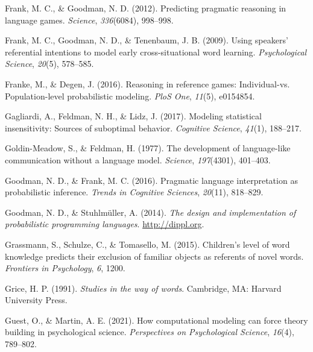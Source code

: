 \documentclass[
  man,floatsintext]{apa6}
\newlength{\cslhangindent}
\newlength{\cslentryspacingunit} %
\newenvironment{CSLReferences}[2] %
 {%
  \setlength{\parindent}{0pt}
  \ifodd #1
  \let\oldpar\par
  \def\par{\hangindent=\cslhangindent\oldpar}
  \fi
  \setlength{\parskip}{#2\cslentryspacingunit}
 }%
 {}
\begin{document}
\begin{CSLReferences}{1}{0}
\leavevmode{}%
Frank, M. C., \& Goodman, N. D. (2012). Predicting pragmatic reasoning in language games. \emph{Science}, \emph{336}(6084), 998--998.

\leavevmode{}%
Frank, M. C., Goodman, N. D., \& Tenenbaum, J. B. (2009). Using speakers' referential intentions to model early cross-situational word learning. \emph{Psychological Science}, \emph{20}(5), 578--585.

\leavevmode{}%
Franke, M., \& Degen, J. (2016). Reasoning in reference games: Individual-vs. Population-level probabilistic modeling. \emph{PloS One}, \emph{11}(5), e0154854.

\leavevmode{}%
Gagliardi, A., Feldman, N. H., \& Lidz, J. (2017). Modeling statistical insensitivity: Sources of suboptimal behavior. \emph{Cognitive Science}, \emph{41}(1), 188--217.

\leavevmode{}%
Goldin-Meadow, S., \& Feldman, H. (1977). The development of language-like communication without a language model. \emph{Science}, \emph{197}(4301), 401--403.

\leavevmode{}%
Goodman, N. D., \& Frank, M. C. (2016). Pragmatic language interpretation as probabilistic inference. \emph{Trends in Cognitive Sciences}, \emph{20}(11), 818--829.

\leavevmode{}%
Goodman, N. D., \& Stuhlmüller, A. (2014). \emph{{The design and implementation of probabilistic programming languages}}. \url{http://dippl.org}.

\leavevmode{}%
Grassmann, S., Schulze, C., \& Tomasello, M. (2015). Children's level of word knowledge predicts their exclusion of familiar objects as referents of novel words. \emph{Frontiers in Psychology}, \emph{6}, 1200.

\leavevmode{}%
Grice, H. P. (1991). \emph{Studies in the way of words}. Cambridge, MA: Harvard University Press.

\leavevmode{}%
Guest, O., \& Martin, A. E. (2021). How computational modeling can force theory building in psychological science. \emph{Perspectives on Psychological Science}, \emph{16}(4), 789--802.


\end{CSLReferences}
\end{document}
